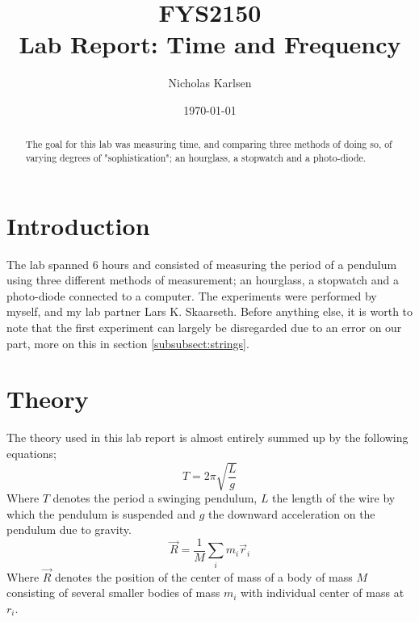 \documentclass[%
 reprint,
 amsmath,amssymb,
 aps,
]{revtex4-1}
\begin{document}

\title{FYS2150 \\
Lab Report: Time and Frequency}%

\author{Nicholas Karlsen}

\date{\today}%

\begin{abstract}
The goal for this lab was measuring time, and comparing three methods of doing so, of varying degrees of "sophistication"; an hourglass, a stopwatch and a photo-diode.
\end{abstract}

\maketitle


\section{\label{sec:intro}Introduction}
	The lab spanned 6 hours and consisted of measuring the period of a pendulum using three different methods of measurement; an hourglass, a stopwatch and a photo-diode connected to a computer. The experiments were performed by myself, and my lab partner Lars K. Skaarseth.
	Before anything else, it is worth to note that the first experiment can largely be disregarded due to an error on our part, more on this in section \ref{subsubsect:strings}.

\section{Theory}
	The theory used in this lab report is almost entirely summed up by the following equations;
	\begin{equation}
        \label{eqn:period}
		T = 2\pi \sqrt{\frac{L}{g}}
	\end{equation}
	Where $T$ denotes the period a swinging pendulum, $L$ the length of the wire by which the pendulum is suspended and $g$ the downward acceleration on the pendulum due to gravity.
	\begin{equation}
		\label{eqn:cm}
		\vec R = \frac{1}{M} \sum_i m_i \vec r_i
	\end{equation}
	Where $\vec R$ denotes the position of the center of mass of a body of mass $M$ consisting of several smaller bodies of mass $m_i$ with individual center of mass at $r_i$.
\end{document}
